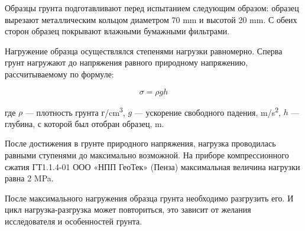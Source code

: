 Образцы грунта подготавливают перед испытанием следующим образом:
образец вырезают металлическим кольцом диаметром 70 \si{\milli\meter} 
и высотой 20 \si{\milli\meter}. С обеих сторон образец покрывают 
влажными бумажными фильтрами. 

Нагружение образца осуществлялся степенями нагрузки равномерно. 
Сперва грунт нагружают до напряжения равного природному 
напряжению, рассчитываемому по формуле: 

\[
   \sigma = \rho g h
\]

где $\rho$ --- плотность грунта г/\si{\centi\meter^3},
$g$ --- ускорение свободного падения, \si{\meter}/\si{\second^2},
$h$ --- глубина, с которой был отобран образец, \si{\meter}.

После достижения в грунте природного напряжения, нагрузка 
проводилась равными ступенями до максимально возможной. На приборе 
компрессионного сжатия ГТ1.1.4-01 ООО «НПП ГеоТек» (Пенза) максимальная 
величина нагрузки равна 2 \si{\mega\pascal}.

После максимального нагружения образца грунта необходимо разгрузить
его. И цикл нагрузка-разгрузка может повториться, это зависит от 
желания исследователя и особенностей грунта.

